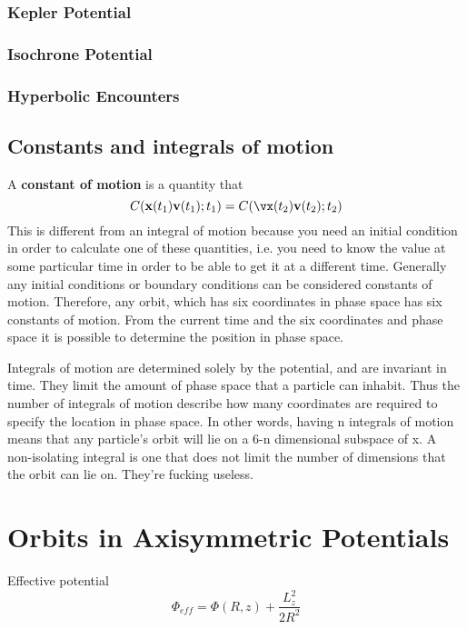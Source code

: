 \subsubsection{Kepler Potential}
\subsubsection{Isochrone Potential}
\subsubsection{Hyperbolic Encounters}



\subsection{Constants and integrals of motion}
A \textbf{constant of motion} is a quantity that 
\begin{equation}
C(\v{x}(t_1) \v{v}(t_1); t_1) = C(\vx(t_2) \v{v}(t_2); t_2)
\end{equation}
This is different from an integral of motion because you need an
initial condition in order to calculate one of these quantities,
i.e. you need to know the value at some particular time in order to be
able to get it at a different time. Generally any initial conditions
or boundary conditions can be considered constants of
motion. Therefore, any orbit, which has six coordinates in phase space
has six constants of motion. From the current time and the six coordinates and
phase space it is possible to determine the position in phase space. 

Integrals of motion are determined solely by the potential, and are
invariant in time. They limit the amount of phase space that a
particle can inhabit. Thus the number of integrals of motion describe
how many coordinates are required to specify the location in phase
space. In other words, having n integrals of motion means that any
particle's orbit will lie on a 6-n dimensional subspace of x. A
non-isolating integral is one that does not limit the number of
dimensions that the orbit can lie on. They're fucking useless. 

\section{Orbits in Axisymmetric Potentials}
Effective potential
\begin{equation}
\Phi_{eff} = \Phi(R, z) + \frac{L_z^2}{2R^2}
\end{equation}



